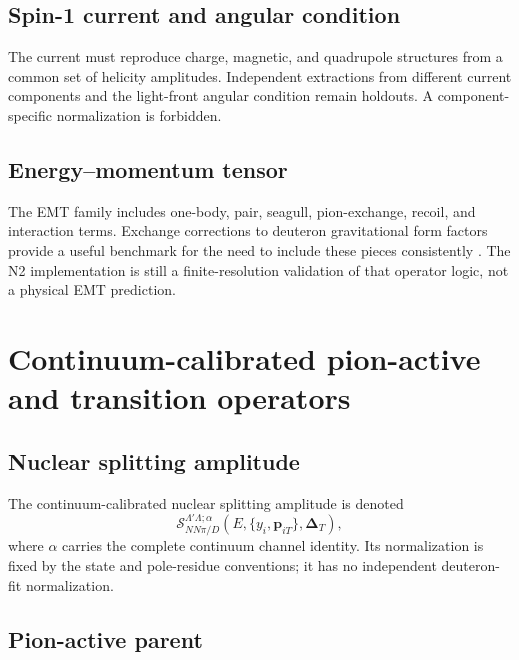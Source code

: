 \documentclass[11pt]{article}
\newcommand{\DT}{\bm{\Delta}_{T}}
\newcommand{\cS}{\mathcal S}
\begin{document}
\subsection{Spin-1 current and angular condition}

The current must reproduce charge, magnetic, and quadrupole structures from a
common set of helicity amplitudes.  Independent extractions from different
current components and the light-front angular condition remain holdouts.  A
component-specific normalization is forbidden.

\subsection{Energy--momentum tensor}

The EMT family includes one-body, pair, seagull, pion-exchange, recoil, and
interaction terms.  Exchange corrections to deuteron gravitational form
factors provide a useful benchmark for the need to include these pieces
consistently \cite{HeZahed2024}.  The N2 implementation is still a
finite-resolution validation of that operator logic, not a physical EMT
prediction.

\section{Continuum-calibrated pion-active and transition operators}
\label{sec:pion-operators}

\subsection{Nuclear splitting amplitude}

The continuum-calibrated nuclear splitting amplitude is denoted
\begin{equation}
 \cS_{NN\pi/D}^{\Lambda'\Lambda;\alpha}
 (E,\{y_i,\bm p_{iT}\},\DT),
 \label{eq:continuum-splitting}
\end{equation}
where \(\alpha\) carries the complete continuum channel identity.  Its
normalization is fixed by the state and pole-residue conventions; it has no
independent deuteron-fit normalization.

\subsection{Pion-active parent}
\end{document}
